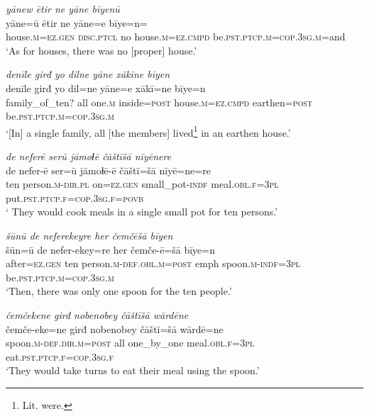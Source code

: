 \ea \label{ŽE.25}
\textit{yānew ētir ne yāne bīyenū} \\ 
\gll yāne=ū ētir ne yāne=e bīye=n=\\ 
 house\textsc{.m}\textsc{\textsc{=ez.gen}} \textsc{disc.ptcl} no house\textsc{.m}\textsc{=ez}\textsc{.cmpd} be\textsc{.pst}\textsc{.ptcp}\textsc{.m}\textsc{=cop}\textsc{.3sg}\textsc{.m}=and \\ 
\glt `As for houses, there was no [proper] house.'
\z 
 
\ea \label{ŽE.26}
\textit{denīle girđ yo dilne yāne xākīne bīyen} \\ 
\gll denīle girđ yo dil=ne yāne=e xākī=ne bīye=n \\ 
 family\_of\_ten? all one\textsc{.m} inside\textsc{=\textsc{post}} house\textsc{.m}\textsc{=ez}\textsc{.cmpd} earthen\textsc{=\textsc{post}} be\textsc{.pst}\textsc{.ptcp}\textsc{.m}\textsc{=cop}\textsc{.3sg}\textsc{.m} \\ 
\glt `[In] a single family, all [the members] lived\footnote{Lit. were.} in an earthen house.'
\z 
 
\ea \label{ŽE.27}
\textit{de neferē serū jāmoɫē čāštīšā nīyēnere} \\ 
\gll de nefer-ē ser=ū jāmoɫē-ē čāštī=šā nīyē=ne=re \\ 
 ten person\textsc{.m}\textsc{-dir}\textsc{.pl} on\textsc{\textsc{=ez.gen}} small\_pot\textsc{-indf} meal\textsc{.obl}\textsc{.f}\textsc{=3pl} put\textsc{.pst}\textsc{.ptcp}\textsc{.f}\textsc{=cop}\textsc{.3sg}\textsc{.f}\textsc{=\textsc{povb}} \\ 
\glt ` They would cook meals in a single small pot for ten persons.'
\z 
 
\ea \label{ŽE.28}
\textit{šūnū de neferekeyre her čemčēšā bīyen} \\ 
\gll šūn=ū de nefer-ekey=re her čemče-ē=šā bīye=n \\ 
 after\textsc{\textsc{=ez.gen}} ten person\textsc{.m}\textsc{-def}\textsc{.obl}\textsc{.m}\textsc{=\textsc{post}} emph spoon\textsc{.m}\textsc{-indf}\textsc{=3pl} be\textsc{.pst}\textsc{.ptcp}\textsc{.m}\textsc{=cop}\textsc{.3sg}\textsc{.m} \\ 
\glt `Then, there was only one spoon for the ten people.'
\z 
 
\ea \label{ŽE.29}
\textit{čemčekene girđ nobenobey čāštīšā wārdēne} \\ 
\gll čemče-eke=ne girđ nobenobey čāštī=šā wārdē=ne \\ 
 spoon\textsc{.m}\textsc{-def}\textsc{.dir}\textsc{.m}\textsc{=\textsc{post}} all one\_by\_one meal\textsc{.obl}\textsc{.f}\textsc{=3pl} eat\textsc{.pst}\textsc{.ptcp}\textsc{.f}\textsc{=cop}\textsc{.3sg}\textsc{.f} \\ 
\glt `They would take turns to eat their meal using the spoon.'
\z 
 
